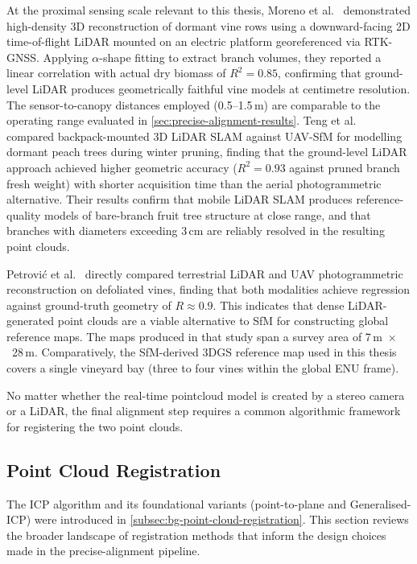 At the proximal sensing scale relevant to this thesis, Moreno et al.~\cite{morenoOnGroundVineyardReconstruction2020} demonstrated high-density 3D reconstruction of dormant vine rows using a downward-facing 2D time-of-flight LiDAR mounted on an electric platform georeferenced via RTK-GNSS. Applying $\alpha$-shape fitting to extract branch volumes, they reported a linear correlation with actual dry biomass of $R^2 = 0.85$, confirming that ground-level LiDAR produces geometrically faithful vine models at centimetre resolution. The sensor-to-canopy distances employed (0.5--1.5\,m) are comparable to the operating range evaluated in \cref{sec:precise-alignment-results}. Teng et al.~\cite{tengAccuracyEvaluationBranch2023} compared backpack-mounted 3D LiDAR SLAM against UAV-SfM for modelling dormant peach trees during winter pruning, finding that the ground-level LiDAR approach achieved higher geometric accuracy ($R^2 = 0.93$ against pruned branch fresh weight) with shorter acquisition time than the aerial photogrammetric alternative. Their results confirm that mobile LiDAR SLAM produces reference-quality models of bare-branch fruit tree structure at close range, and that branches with diameters exceeding 3\,cm are reliably resolved in the resulting point clouds.

Petrović et al.~\cite{petrovicVineCanopyReconstruction2022} directly compared terrestrial LiDAR and UAV photogrammetric reconstruction on defoliated vines, finding that both modalities achieve regression against ground-truth geometry of $R \approx 0.9$. This indicates that dense LiDAR-generated point clouds are a viable alternative to SfM for constructing global reference maps. The maps produced in that study span a survey area of 7\,m~$\times$~28\,m. Comparatively, the SfM-derived 3DGS reference map used in this thesis covers a single vineyard bay (three to four vines within the global ENU frame). 

No matter whether the real-time pointcloud model is created by a stereo camera or a LiDAR, the final alignment step requires a common algorithmic framework for registering the two point clouds.

\subsection{Point Cloud Registration}
\label{subsec:registration-methods}

The ICP algorithm and its foundational variants (point-to-plane and Generalised-ICP) were introduced in \cref{subsec:bg-point-cloud-registration}. This section reviews the broader landscape of registration methods that inform the design choices made in the precise-alignment pipeline.


